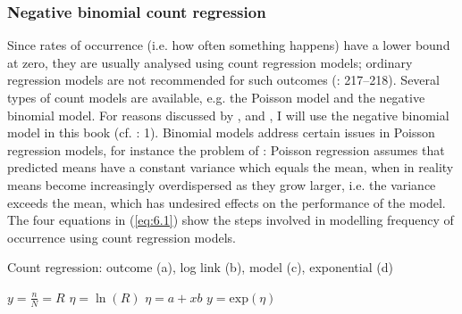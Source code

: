 \subsubsection{Negative binomial count regression}\label{sec:6.3.3.1}

Since rates of occurrence (i.e. how often something happens) have a lower bound at zero, they are usually analysed using count regression models; ordinary regression models are not recommended for such outcomes (\citealt{Long1997}: 217–218). Several types of count models are available, e.g. the Poisson model and the negative binomial model. For reasons discussed by \citet[7, 127]{Agresti2013}, \citet[230]{Long1997} and \citet[115–116]{GelmanHill2007}, I will use the negative binomial model in this book (cf. \citealt{CameronTrivedi2013}: 1). Binomial models address certain issues in Poisson regression models, for instance the problem of : Poisson regression assumes that predicted means have a constant variance which equals the mean, when in reality means become increasingly overdispersed as they grow larger, i.e. the variance exceeds the mean, which has undesired effects on the performance of the model. The four equations in (\ref{eq:6.1}) show the steps involved in modelling frequency of occurrence using count regression models.

\ea\label{bkm:Ref40195674}\label{eq:6.1}%
Count regression: outcome (a), log link (b), model (c), exponential (d)\smallskip\\
{\multicolsep=0pt\begin{multicols}{2}
\ea ${\displaystyle y = \frac{n}{N} = R} $
\ex ${\displaystyle \eta = \ln(R)}$
\ex ${\displaystyle \eta = a+xb}  $
\ex ${\displaystyle y = \text{exp}(\eta)} $
\z
\end{multicols}}
\z\largerpage[-2]

